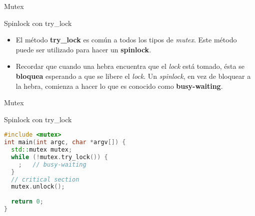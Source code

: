 \begin{frame}{Mutex}
\begin{block}{Spinlock con try\_lock}
\begin{itemize}
  \item El método \textbf{try\_lock} es común a todos los tipos de \textit{mutex}. Este método puede ser utilizado para hacer un \textbf{spinlock}.
  \item Recordar que cuando una hebra encuentra que el \textit{lock} está tomado, ésta se \textbf{bloquea} esperando a que se libere el \textit{lock}. Un \textit{spinlock}, en vez de bloquear a la hebra, comienza a hacer lo que es conocido como \textbf{busy-waiting}.
\end{itemize}
\end{block}
\end{frame}

\begin{frame}[fragile]{Mutex}
\begin{block}{Spinlock con try\_lock}
\begin{lstlisting}[language=C++, basicstyle=\small]
#include <mutex>
int main(int argc, char *argv[]) {
  std::mutex mutex;
  while (!mutex.try_lock()) {
    ;	// busy-waiting
  }
  // critical section
  mutex.unlock();
  
  return 0;
}

\end{lstlisting}
\end{block}
\end{frame}

